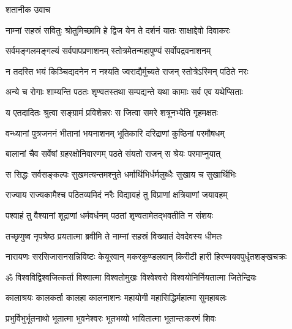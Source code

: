 शतानीक उवाच\nopagebreak[4]

\twolineshloka
{नाम्नां सहस्रं सवितुः श्रोतुमिच्छामि हे द्विज}
{येन ते दर्शनं यातः साक्षाद्देवो दिवाकरः}

\twolineshloka
{सर्वमङ्गलमङ्गल्यं सर्वपापप्रणाशनम्}
{स्तोत्रमेतन्महापुण्यं सर्वोपद्रवनाशनम्}

\twolineshloka
{न तदस्ति भयं किञ्चिद्यदनेन न नश्यति}
{ज्वराद्यैर्मुच्यते राजन् स्तोत्रेऽस्मिन् पठिते नरः}

\twolineshloka
{अन्ये च रोगाः शाम्यन्ति पठतः शृण्वतस्तथा}
{सम्पद्यन्ते यथा कामाः सर्व एव यथेप्सिताः}

\twolineshloka
{य एतदादितः श्रुत्वा सङ्ग्रामं प्रविशेन्नरः}
{स जित्वा समरे शत्रूनभ्येति गृहमक्षतः}

\twolineshloka
{वन्ध्यानां पुत्रजननं भीतानां भयनाशनम्}
{भूतिकारि दरिद्राणां कुष्ठिनां परमौषधम्}

\twolineshloka
{बालानां चैव सर्वेषां ग्रहरक्षोनिवारणम्}
{पठते संयतो राजन् स श्रेयः परमाप्नुयात्}

\twolineshloka
{स सिद्धः सर्वसङ्कल्पः सुखमत्यन्तमश्नुते}
{धर्मार्थिभिर्धर्मलुब्धैः सुखाय च सुखार्थिभिः}

\twolineshloka
{राज्याय राज्यकामैश्च पठितव्यमिदं नरैः}
{विद्यावहं तु विप्राणां क्षत्रियाणां जयावहम्}

\twolineshloka
{पश्वाहं तु वैश्यानां शूद्राणां धर्मवर्धनम्}
{पठतां शृण्वतामेतद्भवतीति न संशयः}

\twolineshloka
{तच्छृणुष्व नृपश्रेष्ठ प्रयतात्मा ब्रवीमि ते}
{नाम्नां सहस्रं विख्यातं देवदेवस्य धीमतः}


\nopagebreak[4]
{नारायणः सरसिजासनसन्निविष्टः}
{केयूरवान् मकरकुण्डलवान् किरीटी}
{हारी हिरण्मयवपुर्धृतशङ्खचक्रः}

\resetShloka
\twolineshloka
{ॐ विश्वविद्विश्वजित्कर्ता विश्वात्मा विश्वतोमुखः}
{विश्वेश्वरो विश्वयोनिर्नियतात्मा जितेन्द्रियः}%

\twolineshloka
{कालाश्रयः कालकर्ता कालहा कालनाशनः}
{महायोगी महासिद्धिर्महात्मा सुमहाबलः}%

\twolineshloka
{प्रभुर्विभुर्भूतनाथो भूतात्मा भुवनेश्वरः}
{भूतभव्यो भावितात्मा भूतान्तःकरणं शिवः}%

